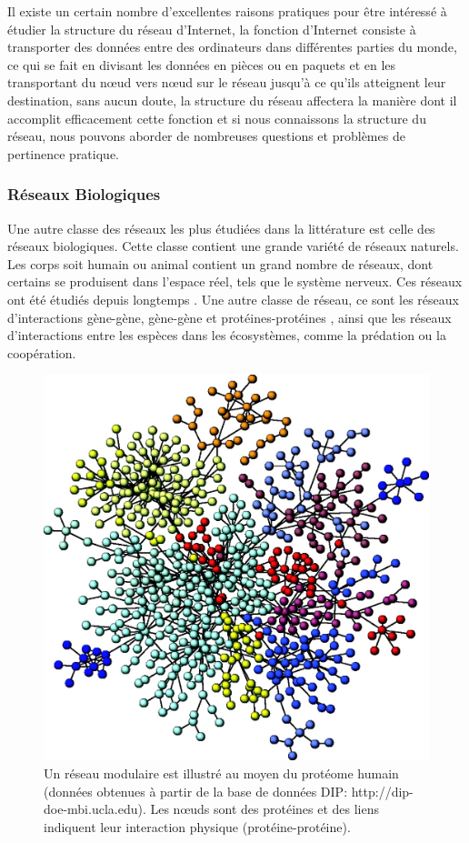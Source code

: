   Il existe un certain nombre d'excellentes raisons pratiques pour être intéressé à étudier la structure du réseau d'Internet, la fonction d'Internet consiste à transporter des données entre des ordinateurs dans différentes parties du monde, ce qui se fait en divisant les données en pièces ou en paquets et en les transportant du nœud vers nœud sur le réseau jusqu'à ce 
  qu'ils atteignent leur destination, sans aucun doute, la structure du réseau affectera la manière dont il accomplit efficacement cette fonction et si nous connaissons la structure du réseau, nous pouvons aborder de nombreuses questions et problèmes de pertinence pratique.
  
  
  \subsubsection{Réseaux Biologiques}
  Une autre classe des  réseaux les plus étudiées dans la littérature est celle des réseaux biologiques. Cette classe contient une grande variété de réseaux naturels. Les corps soit humain ou animal contient un grand nombre de réseaux, dont certains se produisent dans l'espace réel, tels que le système nerveux. Ces réseaux ont été étudiés depuis longtemps \cite{WB1997}.
  Une autre classe de réseau, ce sont les réseaux d'interactions gène-gène, gène-gène et protéines-protéines \cite{DM2003}, ainsi que les réseaux d'interactions entre les espèces dans les écosystèmes, comme la prédation ou la coopération.\\
\begin{figure}[h!]
\centering
\includegraphics[scale=0.2]{./figures/PPI}
\caption{Un réseau modulaire est illustré au moyen du protéome humain (données obtenues à partir de la base de données DIP: http://dip-doe-mbi.ucla.edu). Les nœuds sont des protéines et des liens indiquent leur interaction physique (protéine-protéine).}
\label{PPI}
\end{figure}
